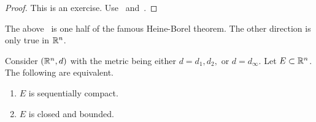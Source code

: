 \begin{proof}
This is an exercise. Use~ and~.
\end{proof}
The above~ is one half of the famous Heine-Borel theorem. The other direction is only true in $\mathbb{R}^n$.
\begin{thm}
	\label{thm:hb_real}
Consider $(\mathbb{R}^n,d)$ with the metric being either $d=d_1,d_2,$ or $d=d_\infty$. Let $E\subset \mathbb{R}^n$. The following are equivalent.
\begin{enumerate}
	\item \label{hb_real_1} $E$ is sequentially compact.
	\item \label{hb_real_2} $E$ is closed and bounded.
\end{enumerate}
\end{thm}
